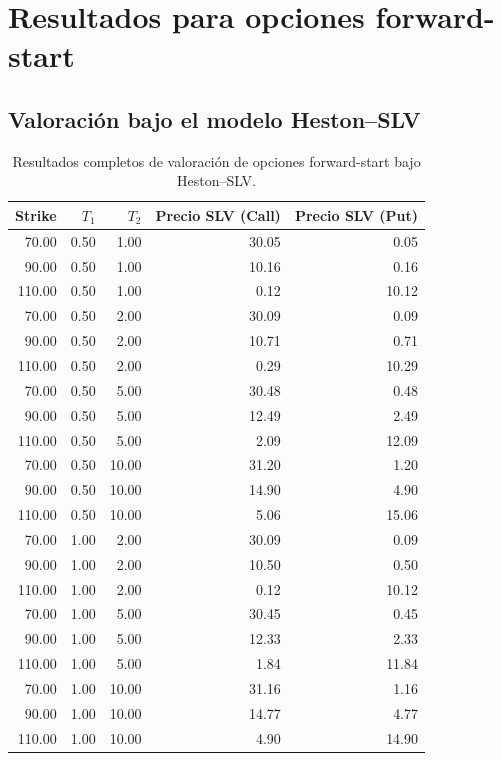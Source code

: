 \chapter{Resultados para opciones forward-start}

\section{Valoración bajo el modelo Heston--SLV}

\begin{table}[H]
\centering
\caption{Resultados completos de valoración de opciones forward-start bajo Heston--SLV.}
\label{tab:apendice_forward_slv}
\scriptsize
\renewcommand{\arraystretch}{0.84}
\begin{tabular}{@{}rrrrr@{}}
\toprule
\textbf{Strike} & \textbf{\(T_1\)} & \textbf{\(T_2\)} & \textbf{Precio SLV (Call)} & \textbf{Precio SLV (Put)} \\
\midrule
70.00  & 0.50 & 1.00  & 30.05 & 0.05  \\
90.00  & 0.50 & 1.00  & 10.16 & 0.16  \\
110.00 & 0.50 & 1.00  & 0.12  & 10.12 \\
70.00  & 0.50 & 2.00  & 30.09 & 0.09  \\
90.00  & 0.50 & 2.00  & 10.71 & 0.71  \\
110.00 & 0.50 & 2.00  & 0.29  & 10.29 \\
70.00  & 0.50 & 5.00  & 30.48 & 0.48  \\
90.00  & 0.50 & 5.00  & 12.49 & 2.49  \\
110.00 & 0.50 & 5.00  & 2.09  & 12.09 \\
70.00  & 0.50 & 10.00 & 31.20 & 1.20  \\
90.00  & 0.50 & 10.00 & 14.90 & 4.90  \\
110.00 & 0.50 & 10.00 & 5.06  & 15.06 \\
70.00  & 1.00 & 2.00  & 30.09 & 0.09  \\
90.00  & 1.00 & 2.00  & 10.50 & 0.50  \\
110.00 & 1.00 & 2.00  & 0.12  & 10.12 \\
70.00  & 1.00 & 5.00  & 30.45 & 0.45  \\
90.00  & 1.00 & 5.00  & 12.33 & 2.33  \\
110.00 & 1.00 & 5.00  & 1.84  & 11.84 \\
70.00  & 1.00 & 10.00 & 31.16 & 1.16  \\
90.00  & 1.00 & 10.00 & 14.77 & 4.77  \\
110.00 & 1.00 & 10.00 & 4.90  & 14.90 \\

\end{tabular}
\end{table}
